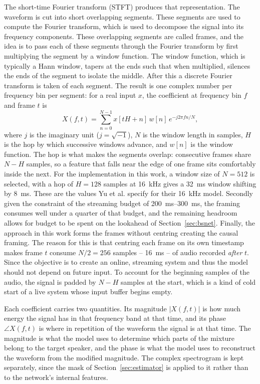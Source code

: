 The short-time Fourier transform (STFT) produces that representation. The waveform is cut into short overlapping segments. These segments are used to compute the Fourier transform, which is used to decompose the signal into its frequency components. These overlapping segments are called frames, and the idea is to pass each of these segments through the Fourier transform by first multiplying the segment by a window function. The window function, which is typically a Hann window, tapers at the ends such that when multiplied, silences the ends of the segment to isolate the middle. After this a discrete Fourier transform is taken of each segment. The result is one complex number per frequency bin per segment: for a real input $x$, the coefficient at frequency bin $f$ and frame $t$ is
\begin{equation}
X(f, t) = \sum_{n=0}^{N-1} x[tH + n]\,w[n]\,e^{-j2\pi fn/N},
\label{eq:stft}
\end{equation}
where $j$ is the imaginary unit ($j = \sqrt{-1}$), $N$ is the window length in samples, $H$ is the hop by which successive windows advance, and $w[n]$ is the window function. The hop is what makes the segments overlap: consecutive frames share $N - H$ samples, so a feature that falls near the edge of one frame sits comfortably inside the next. For the implementation in this work, a window size of $N = 512$ is selected, with a hop of $H = 128$ samples at \SI{16}{\kHz} gives a \SI{32}{\ms} window shifting by \SI{8}{\ms}. These are the values Yu et al. \cite{yu2023high} specify for their \SI{16}{\kHz} model. Secondly given the constraint of the streaming budget of \SIrange{200}{300}{\ms}, the framing consumes well under a quarter of that budget, and the remaining headroom allows for budget to be spent on the lookahead of Section~\ref{sec:bsnet}. Finally, the approach in this work forms the frames without centring creating the causal framing. The reason for this is that centring each frame on its own timestamp makes frame $t$ consume $N/2 = 256$ samples -- \SI{16}{\ms} -- of audio recorded \emph{after} $t$. Since the objective is to create an online, streaming system and thus the model should not depend on future input. To account for the beginning samples of the audio, the signal is padded by $N - H$ samples at the start, which is a kind of cold start of a live system whose input buffer begins empty.

Each coefficient carries two quantities. Its magnitude $|X(f,t)|$ is how much energy the signal has in that frequency band at that time, and its phase $\angle X(f,t)$ is where in repetition of the waveform the signal is at that time. The magnitude is what the model uses to determine which parts of the mixture belong to the target speaker, and the phase is what the model uses to reconstruct the waveform from the modified magnitude. The complex spectrogram is kept separately, since the mask of Section~\ref{sec:estimator} is applied to it rather than to the network's internal features.

